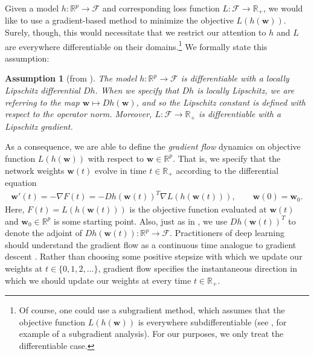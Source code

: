 \documentclass{article}
\newtheorem*{assumption}{Assumption}
\begin{document}
Given a model $h: \mathbb{R}^p \rightarrow \mathcal{F}$ and corresponding loss function $L: \mathcal{F} \rightarrow \mathbb{R}_+$, we would like to use a gradient-based method to minimize the objective $L(h(\boldsymbol{w}))$. Surely, though, this would necessitate that we restrict our attention to $h$ and $L$ are everywhere differentiable on their domains.\footnote{Of course, one could use a subgradient method, which assumes that the objective function $L(h(\boldsymbol{w}))$ is everywhere subdifferentiable (see \cite{lyu2019gradient}, for example of a subgradient analysis). For our purposes, we only treat the differentiable case.} We formally state this assumption:
\begin{assumption}[from \cite{chizat2018lazy}]\label{assumption1}
The model $h: \mathbb{R}^p \rightarrow \mathcal{F}$ is differentiable with a locally Lipschitz differential $Dh$. When we specify that $Dh$ is locally Lipschitz, we are referring to the map $\boldsymbol{w} \mapsto Dh(\boldsymbol{w})$, and so the Lipschitz constant is defined with respect to the operator norm. Moreover, $L: \mathcal{F} \rightarrow \mathbb{R}_+$ is differentiable with a Lipschitz gradient.
\end{assumption}
As a consequence, we are able to define the \textit{gradient flow} dynamics on objective function $L(h(\boldsymbol{w}))$ with respect to $\boldsymbol{w} \in \mathbb{R}^p$. That is, we specify that the network weights $\boldsymbol{w}(t)$ evolve in time $t \in \mathbb{R}_+$ according to the differential equation
\begin{align*}
    \boldsymbol{w}'(t) = -\nabla F(t) = - Dh(\boldsymbol{w}(t))^T \nabla L(h(\boldsymbol{w}(t))), \qquad \boldsymbol{w}(0) = \boldsymbol{w}_0.
\end{align*}
Here, $F(t) = L(h(\boldsymbol{w}(t)))$ is the objective function evaluated at $\boldsymbol{w}(t)$ and $\boldsymbol{w}_0 \in \mathbb{R}^p$ is some starting point. Also, just as in \cite{chizat2018lazy}, we use $Dh(\boldsymbol{w}(t))^T$ to denote the adjoint of $Dh(\boldsymbol{w}(t)): \mathbb{R}^p \rightarrow \mathcal{F}$. Practitioners of deep learning should understand the gradient flow as a continuous time analogue to gradient descent \cite{wibisono2016}. Rather than choosing some positive stepsize with which we update our weights at $t \in \{0, 1, 2, \ldots \}$, gradient flow specifies the instantaneous direction in which we should update our weights at every time $t \in \mathbb{R}_+$.
\end{document}
